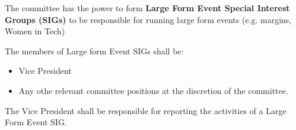 \begin{clause}
    The committee has the power to form \textbf{Large Form Event Special Interest Groups (SIGs)} to be responsible for running large form events (e.g. margins, Women in Tech)
\end{clause}

\begin{subclause}
    The members of Large form Event SIGs shall be:
    \begin{itemize}[label=--,topsep=0em,itemsep=0em]
        \item Vice President
        \item Any othe relevant committee positions at the discretion of the committee.
    \end{itemize}
\end{subclause}

\begin{subclause}
    The Vice President shall be responsible for reporting the activities of a Large Form Event SIG.
\end{subclause}